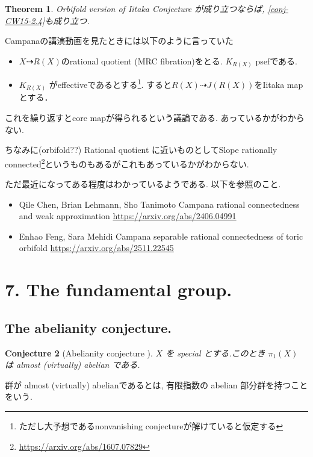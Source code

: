 \documentclass[dvipdfmx,a4paper,11pt]{article} %
\newtheorem{thm}{Theorem}[section]
\newtheorem{conj}[thm]{Conjecture}
\theoremstyle{definition}
\theoremstyle{remark}
\numberwithin{equation}{section}
\begin{document}
\begin{thm}
Orbifold version of Iitaka Conjecture が成り立つならば, 
\ref{conj-CW15-2.4}も成り立つ. 
\end{thm}

Campanaの講演動画を見たときには以下のように言っていた
\begin{itemize}
\item$X \dashrightarrow R(X)$のrational quotient (MRC fibration)をとる. $K_{R(X)}$ psefである.
\item  $K_{R(X)}$ がeffectiveであるとする\footnote{ただし大予想であるnonvanishing conjectureが解けていると仮定する}. すると$R(X) \dashrightarrow J(R(X))$をIitaka mapとする．  
\end{itemize}
これを繰り返すとcore mapが得られるという議論である. あっているかがわからない. 

ちなみに(orbifold??) Rational quotient に近いものとしてSlope rationally connected\footnote{\url{https://arxiv.org/abs/1607.07829}}というものもあるがこれもあっているかがわからない. 

ただ最近になってある程度はわかっているようである. 以下を参照のこと. 
\begin{itemize}
\item Qile Chen, Brian Lehmann, Sho Tanimoto
Campana rational connectedness and weak approximation  \url{https://arxiv.org/abs/2406.04991}
\item Enhao Feng, Sara Mehidi Campana separable rational connectedness of toric orbifold \url{https://arxiv.org/abs/2511.22545}
\end{itemize}


\section{7. The fundamental group.}

\subsection{The abelianity conjecture. \cite[7.1]{Cam04}}

\begin{conj}[{Abelianity conjecture \cite[Conjecture 7.1]{Cam04}}]
\(X\) を special とする.このとき \(\pi_1(X)\) は almost (virtually) abelian である.
\end{conj}
群が almost (virtually) abelianであるとは, 有限指数の abelian 部分群を持つことをいう.
\end{document}
